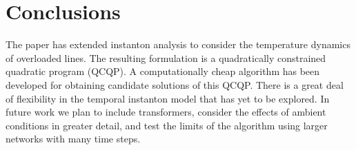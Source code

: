\documentclass[conference]{IEEEtran}
\begin{document}
\section{Conclusions}

The paper has extended instanton analysis to consider the temperature
dynamics of overloaded lines. The resulting formulation is a
quadratically constrained quadratic program (QCQP)\@. A
computationally cheap algorithm has been developed for obtaining
candidate solutions of this QCQP\@.  There is a great deal of
flexibility in the temporal instanton model that has yet to be
explored. In future work we plan to include transformers, consider the
effects of ambient conditions in greater detail, and test the limits
of the algorithm using larger networks with many time steps.






%

\end{document}
